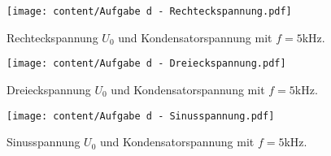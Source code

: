 \begin{figure}
  \centering
  \texttt{[image: content/Aufgabe d - Rechteckspannung.pdf]}
  \caption{Rechteckspannung $U_{0}$ und Kondensatorspannung mit $f=5$kHz.}
  \label{fig:aufgabe d - rechteckspannung}
\end{figure}

\begin{figure}
  \centering
  \texttt{[image: content/Aufgabe d - Dreieckspannung.pdf]}
  \caption{Dreieckspannung $U_{0}$ und Kondensatorspannung mit $f=5$kHz.}
  \label{fig:aufgabe d - dreieckspannung}
\end{figure}

\begin{figure}
  \centering
  \texttt{[image: content/Aufgabe d - Sinusspannung.pdf]}
  \caption{Sinusspannung $U_{0}$ und Kondensatorspannung mit $f=5$kHz.}
  \label{fig:aufgabe d - sinusspannung}
\end{figure}
